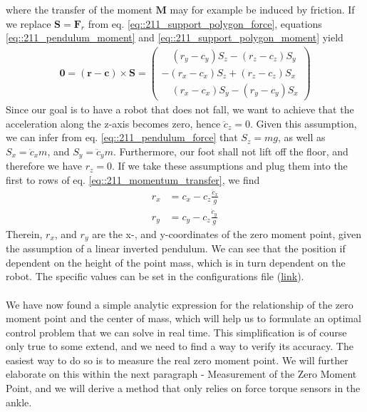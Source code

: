where the transfer of the moment $\bm{M}$ may for example be induced by friction. If we replace $\bm{S}=\bm{F}_r$ from eq. \ref{eq::211_support_polygon_force}, equations \ref{eq::211_pendulum_moment} and \ref{eq::211_support_polygon_moment} yield 
\begin{align}
	\bm{0} = (\bm{r}-\bm{c})\times\bm{S} = \begin{pmatrix}
	\quad(r_y - c_y)S_z - (r_z - c_z)S_y \\
	-(r_x - c_x)S_z + (r_z - c_z)S_x \\
	\quad(r_x - c_x)S_y - (r_y - c_y)S_x
	\end{pmatrix}
	\label{eq::211_momentum_transfer}
\end{align}
Since our goal is to have a robot that does not fall, we want to achieve that the acceleration along the z-axis becomes zero, hence $\ddot{c}_z=0$. Given this assumption, we can infer from eq. \ref{eq::211_pendulum_force} that $S_z=mg$, as well as $S_x = \ddot{c}_xm$, and $S_y = \ddot{c}_ym$. Furthermore, our foot shall not lift off the floor, and therefore we have $r_z=0$. If we take these assumptions and plug them into the first to rows of eq. \ref{eq::211_momentum_transfer}, we find
\begin{align}
	r_x &= c_x - c_z\frac{\ddot{c}_x}{g}
	\label{eq::211_zmp_x}\\
	r_y &= c_y - c_z\frac{\ddot{c}_y}{g}
	\label{eq::211_zmp_y}
\end{align}
Therein, $r_x$, and $r_y$ are the x-, and y-coordinates of the zero moment point, given the assumption of a linear inverted pendulum. We can see that the position if dependent on the height of the point mass, which is in turn dependent on the robot. The specific values can be set in the configurations file (\href{https://github.com/mhubii/nmpc_pattern_generator/blob/bc79a6d4f9bcfd3794146355af44429f5b7a9fe0/libs/pattern_generator/configs.yaml#L27}{\underline{link}}).
\\\\
We have now found a simple analytic expression for the relationship of the zero moment point and the center of mass, which will help us to formulate an optimal control problem that we can solve in real time. This simplification is of course only true to some extend, and we need to find a way to verify its accuracy. The easiest way to do so is to measure the real zero moment point. We will further elaborate on this within the next paragraph - Measurement of the Zero Moment Point, and we will derive a method that only relies on force torque sensors in the ankle.
\FloatBarrier
